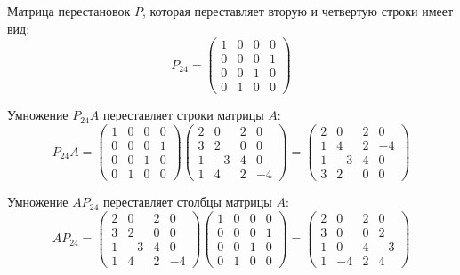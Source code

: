 \documentclass[a4paper,14pt]{article}
\begin{document}
Матрица перестановок $P$, которая переставляет вторую и четвертую строки имеет вид:
$$
P_{24} = \begin{pmatrix}
1 & 0 & 0 & 0 \\
0 & 0 & 0 & 1 \\
0 & 0 & 1 & 0 \\
0 & 1 & 0 & 0
\end{pmatrix}
$$

Умножение $P_{24}A$ переставляет строки матрицы $A$:
$$
P_{24}A = \begin{pmatrix}
        1 & 0 & 0 & 0 \\
        0 & 0 & 0 & 1 \\
        0 & 0 & 1 & 0 \\
        0 & 1 & 0 & 0
    \end{pmatrix}
    \begin{pmatrix}
        2 & 0 & 2 & 0 \\
        3 & 2 & 0 & 0 \\
        1 & -3 & 4 & 0 \\
        1 & 4 & 2 & -4
    \end{pmatrix}
    = 
    \begin{pmatrix}
        2 & 0 & 2 & 0 \\
        1 & 4 & 2 & -4 \\
        1 & -3 & 4 & 0 \\
        3 & 2 & 0 & 0
    \end{pmatrix}
    $$

Умножение $AP_{24}$ переставляет столбцы матрицы $A$:
$$
AP_{24} = \begin{pmatrix}
        2 & 0 & 2 & 0 \\
        3 & 2 & 0 & 0 \\
        1 & -3 & 4 & 0 \\
        1 & 4 & 2 & -4
    \end{pmatrix}
    \begin{pmatrix}
        1 & 0 & 0 & 0 \\
        0 & 0 & 0 & 1 \\
        0 & 0 & 1 & 0 \\
        0 & 1 & 0 & 0
    \end{pmatrix}
    = 
    \begin{pmatrix}
        2 & 0 & 2 & 0 \\
        3 & 0 & 0 & 2 \\
        1 & 0 & 4 & -3 \\
        1 & -4 & 2 & 4
    \end{pmatrix}
    $$
\end{document}
